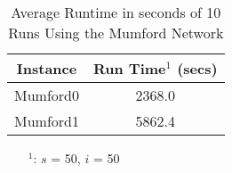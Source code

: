 
\begin{table}[H]
    \centering
    \hspace*{-1.0cm}
    \begin{tabular}{|c|c|}
        \hline
        \textbf{Instance} & \textbf{Run Time$^1$ (secs)} \\
        \hline
        Mumford0 & 2368.0\\
        \hline
        Mumford1 & 5862.4\\
        \hline
    \end{tabular}
    \caption{Average Runtime in seconds of 10 Runs Using the Mumford Network}
    \label{tabel:runTimeMumford}
    \begin{itemize}[noitemsep]
    \item[$^1$:] $s$ = 50, $i$ = 50
    \end{itemize} 
\end{table}







